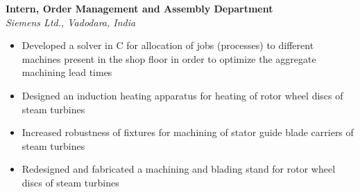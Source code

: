 \vspace{0.1 in}

\large{\textbf{Intern, Order Management and Assembly Department}}
\hfill
\siemensdate\\
\large{\emph{Siemens Ltd., Vadodara, India}}
\begin{itemize}
\item\large{Developed a solver in C for allocation of jobs (processes) to different machines present in the shop floor in order to optimize the aggregate machining lead times}
\item\large{Designed an induction heating apparatus for heating of rotor wheel discs of steam turbines}
\item\large{Increased robustness of fixtures for machining of stator guide blade carriers of steam turbines}
\item\large{Redesigned and fabricated a machining and blading stand for rotor wheel discs of steam turbines }
\end{itemize}


